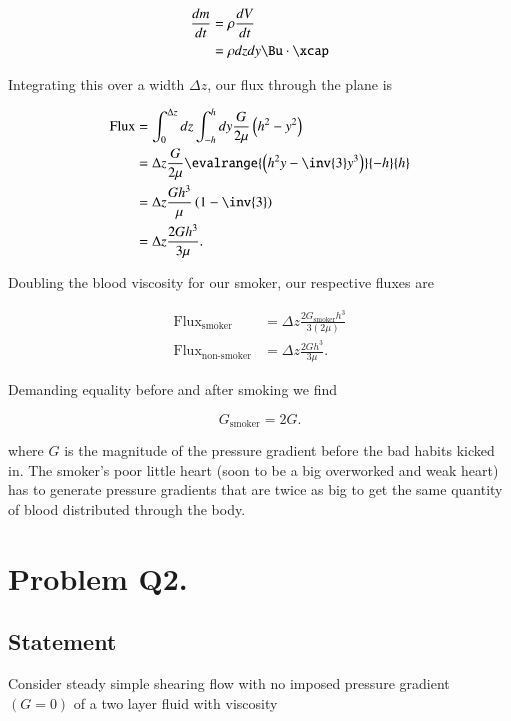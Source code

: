 \begin{align*}
\frac{dm}{dt} 
&= \rho \frac{dV}{dt} \\
&= \rho dz dy \Bu \cdot \xcap
\end{align*}

Integrating this over a width $\Delta z$, our flux through the plane is

\begin{align*}
\text{Flux} 
&= 
\int_0^{\Delta z} dz
\int_{-h}^h dy \frac{G}{2 \mu} \left( h^2 - y^2 \right) \\
&= 
\Delta z 
\frac{G}{2 \mu} 
\evalrange{ \left( h^2 y - \inv{3} y^3 \right) }{-h}{h} \\
&=
\Delta z 
\frac{G h^3}{\mu} \left( 1 - \inv{3} \right)  \\
&=
\Delta z \frac{2 G h^3}{3 \mu}.
\end{align*}

Doubling the blood viscosity for our smoker, our respective fluxes are

\begin{align}\label{eqn:continuumProblemSet2:320}
\text{Flux}_{\text{smoker}} &= \Delta z \frac{2 G_{\text{smoker}} h^3}{3 (2 \mu)}  \\
\text{Flux}_{\text{non-smoker}} &= \Delta z \frac{2 G h^3}{3 \mu}.
\end{align}

Demanding equality before and after smoking we find

\begin{equation}\label{eqn:continuumProblemSet2:260}
G_{\text{smoker}} = 2 G.
\end{equation}

where $G$ is the magnitude of the pressure gradient before the bad habits kicked in.  The smoker's poor little heart (soon to be a big overworked and weak heart) has to generate pressure gradients that are twice as big to get the same quantity of blood distributed through the body.

\section{Problem Q2.}
\subsection{Statement}

Consider steady simple shearing flow with no imposed pressure gradient $(G = 0)$ of a two layer fluid with viscosity

